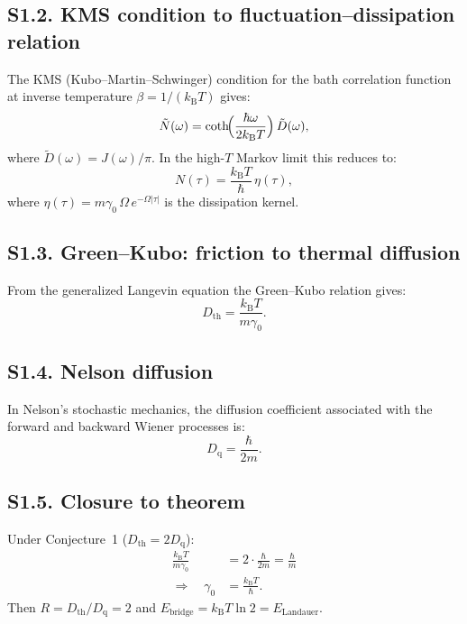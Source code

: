 \documentclass[twocolumn,showpacs,preprintnumbers,amsmath,amssymb]{revtex4-2}
\newcommand{\kB}{k_{\mathrm{B}}}
\newcommand{\Dth}{D_{\mathrm{th}}}
\newcommand{\Dq}{D_{\mathrm{q}}}
\newcommand{\Ebr}{E_{\mathrm{bridge}}}
\newcommand{\EL}{E_{\mathrm{Landauer}}}
\begin{document}
\subsection{S1.2. KMS condition to fluctuation--dissipation relation}

The KMS (Kubo--Martin--Schwinger) condition for the bath
correlation function at inverse temperature $\beta = 1/(\kB T)$
gives:
\begin{equation}
  \tilde{N}(\omega)
  = \coth\!\Bigl(\frac{\hbar\omega}{2\kB T}\Bigr)\,
  \tilde{D}(\omega) ,
  \label{eq:KMS}
\end{equation}
where $\tilde{D}(\omega) = J(\omega)/\pi$.
In the high-$T$ Markov limit this reduces to:
\begin{equation}
  N(\tau) = \frac{\kB T}{\hbar}\,\eta(\tau) ,
  \label{eq:FDT_highT}
\end{equation}
where $\eta(\tau) = m\gamma_0\,\Omega\,e^{-\Omega|\tau|}$ is
the dissipation kernel.

\subsection{S1.3. Green--Kubo: friction to thermal diffusion}

From the generalized Langevin equation the Green--Kubo relation
gives:
\begin{equation}
  \Dth = \frac{\kB T}{m\gamma_0} .
  \label{eq:GreenKubo}
\end{equation}

\subsection{S1.4. Nelson diffusion}

In Nelson's stochastic mechanics, the diffusion coefficient
associated with the forward and backward Wiener processes is:
\begin{equation}
  \Dq = \frac{\hbar}{2m} .
  \label{eq:Nelson}
\end{equation}

\subsection{S1.5. Closure to theorem}

Under Conjecture~1 ($\Dth = 2\Dq$):
\begin{align}
  \frac{\kB T}{m\gamma_0} &= 2\cdot\frac{\hbar}{2m}
  = \frac{\hbar}{m} \\
  \Rightarrow\quad \gamma_0 &= \frac{\kB T}{\hbar} .
  \label{eq:closure}
\end{align}
Then $R = \Dth/\Dq = 2$ and
$\Ebr = \kB T\ln 2 = \EL$.
\end{document}
